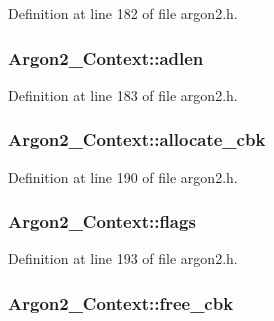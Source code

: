 Definition at line 182 of file argon2.\+h.

\hypertarget{struct_argon2___context_a27f944c49530b5a43d754c1a5ec30918}{}
\subsubsection[{adlen}]{ Argon2\+\_\+\+Context\+::adlen}\label{struct_argon2___context_a27f944c49530b5a43d754c1a5ec30918}


Definition at line 183 of file argon2.\+h.

\hypertarget{struct_argon2___context_aee437e28f004ff3e4a0ea15a7526bf63}{}
\subsubsection[{allocate\+\_\+cbk}]{ Argon2\+\_\+\+Context\+::allocate\+\_\+cbk}\label{struct_argon2___context_aee437e28f004ff3e4a0ea15a7526bf63}


Definition at line 190 of file argon2.\+h.

\hypertarget{struct_argon2___context_a17f2c93463a2d9c0f6017b2d843c6d0c}{}
\subsubsection[{flags}]{ Argon2\+\_\+\+Context\+::flags}\label{struct_argon2___context_a17f2c93463a2d9c0f6017b2d843c6d0c}


Definition at line 193 of file argon2.\+h.

\hypertarget{struct_argon2___context_a496ae30b7ad3db25e1a1ef1fbf98ce0b}{}
\subsubsection[{free\+\_\+cbk}]{ Argon2\+\_\+\+Context\+::free\+\_\+cbk}\label{struct_argon2___context_a496ae30b7ad3db25e1a1ef1fbf98ce0b}


